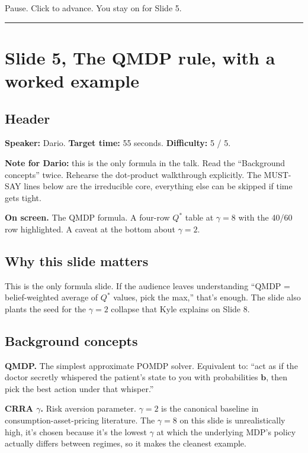 \documentclass[11pt]{article}
\begin{document}
Pause. Click to advance. You stay on for Slide 5.

\bigskip\hrule

\section*{Slide 5, The QMDP rule, with a worked example}

\subsection*{Header}

\textbf{Speaker:} Dario. \quad\textbf{Target time:} 55 seconds. \quad\textbf{Difficulty:} 5 / 5.

\textbf{Note for Dario:} this is the only formula in the talk. Read the ``Background concepts'' twice. Rehearse the dot-product walkthrough explicitly. The MUST-SAY lines below are the irreducible core, everything else can be skipped if time gets tight.

\textbf{On screen.} The QMDP formula. A four-row $Q^*$ table at $\gamma = 8$ with the 40/60 row highlighted. A caveat at the bottom about $\gamma = 2$.

\subsection*{Why this slide matters}

This is the only formula slide. If the audience leaves understanding ``QMDP = belief-weighted average of $Q^*$ values, pick the max,'' that's enough. The slide also plants the seed for the $\gamma = 2$ collapse that Kyle explains on Slide 8.

\subsection*{Background concepts}

\textbf{QMDP.} The simplest approximate POMDP solver. Equivalent to: ``act as if the doctor secretly whispered the patient's state to you with probabilities $\mathbf{b}$, then pick the best action under that whisper.''

\textbf{CRRA $\gamma$.} Risk aversion parameter. $\gamma = 2$ is the canonical baseline in consumption-asset-pricing literature. The $\gamma = 8$ on this slide is unrealistically high, it's chosen because it's the lowest $\gamma$ at which the underlying MDP's policy actually differs between regimes, so it makes the cleanest example.
\end{document}
